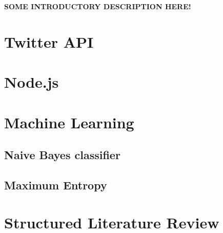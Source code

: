 \textbf{SOME INTRODUCTORY DESCRIPTION HERE!}

\section{Twitter API}


\section{Node.js}
	

\section{Machine Learning}
	\subsection{Naive Bayes classifier}
	
	
	\subsection{Maximum Entropy}
	

\section{Structured Literature Review}
